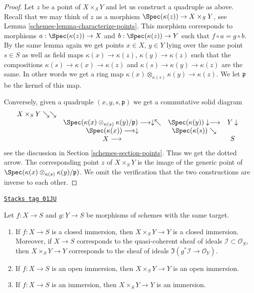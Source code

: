 \begin{proof}

Let $z$ be a point of $X \times_S Y$ and let us construct a
quadruple as above. Recall that we may think of $z$ as a morphism
$\Spec(\kappa(z)) \to X \times_S Y$, see
Lemma \ref{schemes-lemma-characterize-points}. This morphism corresponds
to morphisms $a : \Spec(\kappa(z)) \to X$
and $b : \Spec(\kappa(z)) \to Y$ such that
$f \circ a = g \circ b$. By the same lemma again
we get points $x \in X$, $y \in Y$ lying over the same point
$s \in S$ as well as field maps $\kappa(x) \to \kappa(z)$,
$\kappa(y) \to \kappa(z)$ such that the compositions
$\kappa(s) \to \kappa(x) \to \kappa(z)$
and
$\kappa(s) \to \kappa(y) \to \kappa(z)$
are the same. In other words we get a ring map
$\kappa(x) \otimes_{\kappa(s)} \kappa(y) \to \kappa(z)$.
We let $\mathfrak p$ be the kernel of this map.

\medskip\noindent
Conversely, given a quadruple $(x, y, s, \mathfrak p)$ we get a
commutative solid diagram
$$
\begin{array}{cccc}X \times_S Y
\searrow\searrow &  &  &  \\  & \Spec(\kappa(x) \otimes_{\kappa(s)} \kappa(y)/\mathfrak p)
\longrightarrow\downarrow\nwarrow & \Spec(\kappa(y)) \downarrow\longrightarrow & Y \downarrow \\  & \Spec(\kappa(x)) \longrightarrow\downarrow & \Spec(\kappa(s)) \searrow &  \\  & X \longrightarrow &  & S\end{array}
$$
see the discussion in Section \ref{schemes-section-points}. Thus we get the
dotted arrow. The corresponding point $z$ of $X \times_S Y$ is the
image of the generic point of
$\Spec(\kappa(x) \otimes_{\kappa(s)} \kappa(y)/\mathfrak p)$.
We omit the verification that the two constructions are inverse
to each other.
\end{proof}

\begin{lemma}
\label{schemes-lemma-fibre-product-immersion}
\href{https://stacks.math.columbia.edu/tag/01JU}{\texttt{Stacks tag 01JU}}

Let $f : X \to S$ and $g : Y \to S$ be morphisms of schemes
with the same target.
\begin{enumerate}
\item If $f : X \to S$ is a closed immersion,
then $X \times_S Y \to Y$ is a closed immersion.
Moreover, if $X \to S$ corresponds to the quasi-coherent
sheaf of ideals $\mathcal{I} \subset \mathcal{O}_S$, then
$X \times_S Y \to Y$ corresponds to the sheaf of ideals
$\Im(g^*\mathcal{I} \to \mathcal{O}_Y)$.
\item If $f : X \to S$ is an open immersion,
then $X \times_S Y \to Y$ is an open immersion.
\item If $f : X \to S$ is an immersion,
then $X \times_S Y \to Y$ is an immersion.
\end{enumerate}
\end{lemma}

